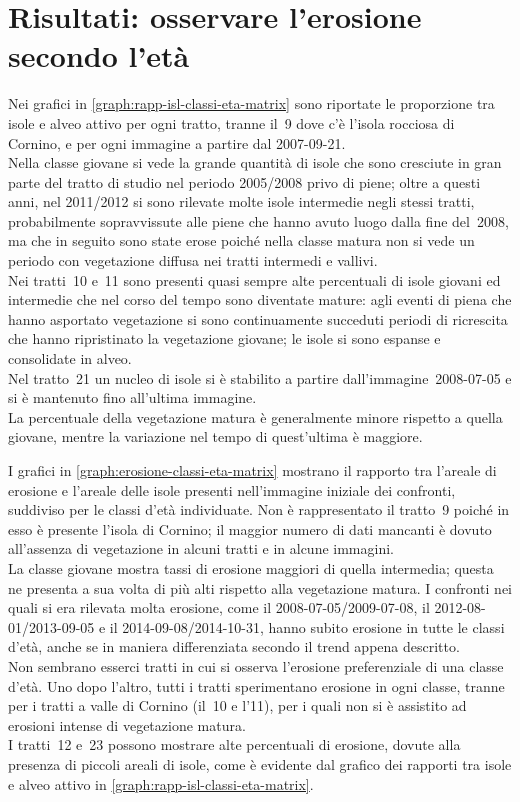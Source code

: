 \section{Risultati: osservare l'erosione secondo l'età}
Nei grafici in \cref{graph:rapp-isl-classi-eta-matrix} sono riportate le proporzione tra isole e alveo attivo per ogni tratto, tranne il~9 dove c'è l'isola rocciosa di Cornino, e per ogni immagine a partire dal 2007-09-21.
\\
Nella classe giovane si vede la grande quantità di isole che sono cresciute in gran parte del tratto di studio nel periodo 2005/2008 privo di piene; oltre a questi anni, nel 2011/2012 si sono rilevate molte isole intermedie negli stessi tratti, probabilmente sopravvissute alle piene che hanno avuto luogo dalla fine del~2008, ma che in seguito sono state erose poiché nella classe matura non si vede un periodo con vegetazione diffusa nei tratti intermedi e vallivi.
\\
Nei tratti~10 e~11 sono presenti quasi sempre alte percentuali di isole giovani ed intermedie che nel corso del tempo sono diventate mature: agli eventi di piena che hanno asportato vegetazione si sono continuamente succeduti periodi di ricrescita che hanno ripristinato la vegetazione giovane; le isole si sono espanse e consolidate in alveo.
\\
Nel tratto~21 un nucleo di isole si è stabilito a partire dall'immagine~2008-07-05 e si è mantenuto fino all'ultima immagine.
\\
La percentuale della vegetazione matura è generalmente minore rispetto a quella giovane, mentre la variazione nel tempo di quest'ultima è maggiore.

I grafici in \cref{graph:erosione-classi-eta-matrix} mostrano il rapporto tra l'areale di erosione e l'areale delle isole presenti nell'immagine iniziale dei confronti, suddiviso per le classi d'età individuate.
Non è rappresentato il tratto~9 poiché in esso è presente l'isola di Cornino; il maggior numero di dati mancanti è dovuto all'assenza di vegetazione in alcuni tratti e in alcune immagini.
\\
La classe giovane mostra tassi di erosione maggiori di quella intermedia; questa ne presenta a sua volta di più alti rispetto alla vegetazione matura.
I confronti nei quali si era rilevata molta erosione, come il 2008-07-05/2009-07-08, il 2012-08-01/2013-09-05 e il 2014-09-08/2014-10-31, hanno subito erosione in tutte le classi d'età, anche se in maniera differenziata secondo il trend appena descritto.
\\
Non sembrano esserci tratti in cui si osserva l'erosione preferenziale di una classe d'età. Uno dopo l'altro, tutti i tratti sperimentano erosione in ogni classe, tranne per i tratti a valle di Cornino (il~10 e l'11), per i quali non si è assistito ad erosioni intense di vegetazione matura.
\\
I tratti~12 e~23 possono mostrare alte percentuali di erosione, dovute alla presenza di piccoli areali di isole, come è evidente dal grafico dei rapporti tra isole e alveo attivo in \cref{graph:rapp-isl-classi-eta-matrix}.

